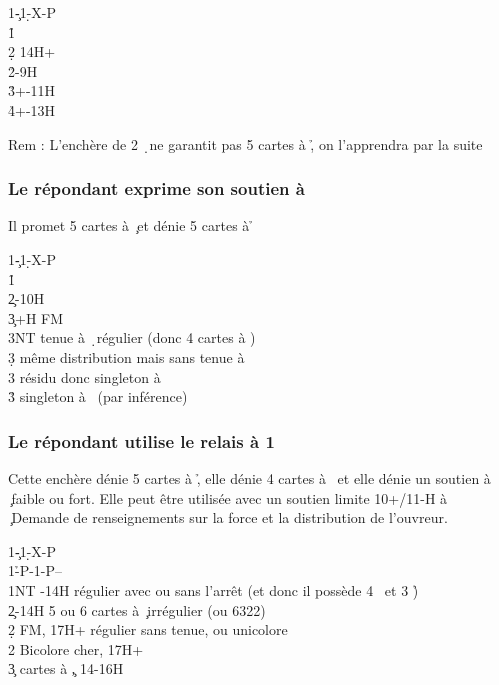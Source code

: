\documentclass[a4paper]{article}
\begin{document}
\begin{bidtable}
1\c-1\d-X-P\\
1\h\+\\
2\d \> 14H+\\
2\h {}-9H\\
3\h {}+-11H\\
4\h {}+-13H\-
\end{bidtable}

Rem : L’enchère de 2 \d\ ne garantit pas 5 cartes à \h , on l’apprendra par la suite

\subsubsection{Le répondant exprime son soutien à \pdfc}

Il promet 5 cartes à \c\ et dénie 5 cartes à \h 

\begin{bidtable}
1\c-1\d-X-P\\
1\h\+\\
2\c {}-10H\\
3\c {}+H FM\+\\
3NT \> tenue à \d\ régulier (donc 4 cartes à \s )\\
3\d \> même distribution mais sans tenue à \d \\
3\s \> résidu donc singleton à \d \\
3\h \> singleton à \s\ (par inférence)\-\-
\end{bidtable}

\subsubsection{Le répondant utilise le relais à 1 \pdfs}

Cette enchère dénie 5 cartes à \h , elle dénie 4 cartes à \s\ et elle dénie un soutien à \c\ faible ou fort.
Elle peut être utilisée avec un soutien limite 10+/11-H à \c\ 
Demande de renseignements sur la force et la distribution de l’ouvreur.

\begin{bidtable}
1\c-1\d-X-P\\
1\h-P-1\s-P--\\
1NT -14H régulier avec ou sans l’arrêt (et donc il possède 4 \s\ et 3 \h )\\
2\c \> 12-14H 5 ou 6 cartes à \c\ irrégulier (ou 6322)\\
2\d \> FM, 17H+ régulier sans tenue, ou unicolore \c \\
2\s \> Bicolore cher, 17H+\\
3\c {} cartes à \c , 14-16H
\end{bidtable}
\end{document}
